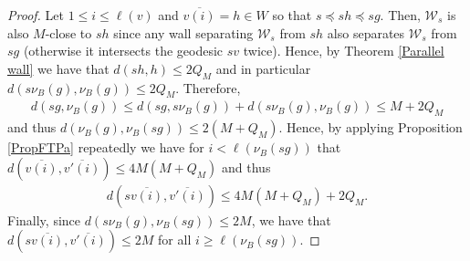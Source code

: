 \documentclass[a4paper,12pt,leqno]{amsart}
\theoremstyle{definition}
\newcommand{\W}{\mathcal{W}}
\newcommand{\vr}{\nu}
\begin{document}
\begin{proof}
    Let $1 \leq i \leq \ell(v)$ and $\overline{v(i)} = h \in W$ so that $s \preceq sh \preceq sg$. Then, $\W_s$ is also $M$-close to $sh$ since any wall separating $\W_s$ from $sh$ also separates $\W_s$ from $sg$ (otherwise it intersects the geodesic $sv$ twice). Hence, by Theorem \ref{Parallel wall} we have that $d(sh, h) \leq 2Q_M$ and in particular $d(s\vr_B(g), \vr_B(g)) \leq 2Q_M$. Therefore,
    \begin{align*}
        d(sg, \vr_B(g)) \leq d(sg, s\vr_B(g)) + d(s\vr_B(g), \vr_B(g)) \leq M + 2Q_M
    \end{align*}
    and thus $d(\vr_B(g), \vr_B(sg)) \leq 2(M+Q_M)$. Hence, by applying Proposition \ref{PropFTPa} repeatedly we have for $i < \ell(\vr_B(sg))$ that $d(\overline{v(i)}, \overline{v'(i)}) \leq 4M(M+Q_M)$ and thus
    \begin{align*}
        d(s\overline{v(i)}, \overline{v'(i)}) \leq 4M(M+Q_M) + 2Q_M.
    \end{align*}
    Finally, since $d(s\vr_B(g), \vr_B(sg)) \leq 2M$, we have that $d(s\overline{v(i)}, \overline{v'(i)}) \leq 2M$ for all $i \geq \ell(\vr_B(sg))$.
\end{proof}





{}

\end{document}

